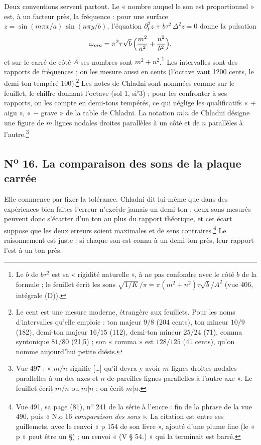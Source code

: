 \documentclass[11pt,a4paper]{article}
\begin{document}
Deux conventions servent partout. Le « nombre auquel le son est proportionnel »
est, à un facteur près, la fréquence : pour une surface
$z = \sin(m\pi x/a)\,\sin(n\pi y/b)$, l'équation
$\partial_t^2 z + b\tau^2\,\Delta^2 z = 0$ donne la pulsation
\[
\omega_{mn} = \pi^2\tau\sqrt{b}\,\Bigl(\frac{m^2}{a^2}+\frac{n^2}{b^2}\Bigr),
\]
et sur le carré de côté $A$ ses nombres sont $m^2+n^2$.\footnote{Le $b$ de
$b\tau^2$ est sa « rigidité naturelle », à ne pas confondre avec le côté $b$ de
la formule ; le feuillet écrit les sons $\sqrt{1/K}\,/\pi = \pi(m^2+n^2)\tau\sqrt{b}/A^2$
(vue 406, intégrale (D)).} Les intervalles sont des rapports de fréquences ; on
les mesure aussi en cents (l'octave vaut 1200 cents, le demi-ton tempéré
100).\footnote{Le cent est une mesure moderne, étrangère aux feuillets. Pour
les noms d'intervalles qu'elle emploie : ton majeur $9/8$ (204 cents), ton
mineur $10/9$ (182), demi-ton majeur $16/15$ (112), demi-ton mineur $25/24$
(71), comma syntonique $81/80$ (21,5) ; son « comma » est $128/125$ (41
cents), qu'on nomme aujourd'hui petite diésis.} Les notes de Chladni sont
nommées comme sur le feuillet, le chiffre donnant l'octave (sol 1,
si$^{\flat}$3) ; pour les confronter à ses rapports, on les compte en
demi-tons tempérés, ce qui néglige les qualificatifs « + aigu », « $-$ grave »
de la table de Chladni. La notation $m|n$ de Chladni désigne une figure de $m$
lignes nodales droites parallèles à un côté et de $n$ parallèles à
l'autre.\footnote{Vue 497 : « $m/n$ signifie […] qu'il devra y avoir $m$
lignes droites nodales parallelles à un des axes et $n$ de pareilles lignes
parallelles à l'autre axe ». Le feuillet écrit $m/n$ ou $m|n$ ; on écrit
$m|n$.}

\subsection*{N\textsuperscript{o} 16. La comparaison des sons de la plaque carrée}

Elle commence par fixer la tolérance. Chladni dit lui-même que dans des
expériences bien faites l'erreur n'excède jamais un demi-ton ; deux sons
mesurés peuvent donc s'écarter d'un ton au plus du rapport théorique, et cet
écart suppose que les deux erreurs soient maximales et de sens
contraires.\footnote{Vue 491, sa page (81), n\textsuperscript{o} 241 de la série
à l'encre : fin de la phrase de la vue 490, puis « N.o 16 \emph{comparaison
des sons} ». La citation est entre ses guillemets, avec le renvoi « p 154 de
son livre », ajouté d'une plume fine (le « p » peut être un §) ; un renvoi
« (V § 54.) » qui la terminait est barré.} Le raisonnement est juste : si
chaque son est connu à un demi-ton près, leur rapport l'est à un ton près.
\end{document}
